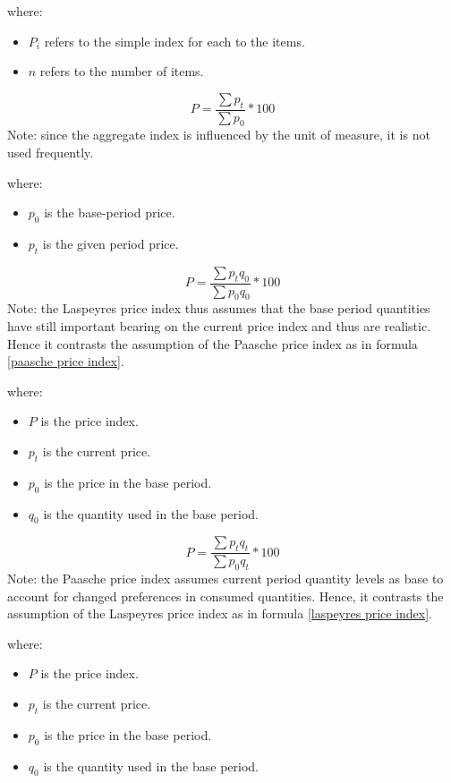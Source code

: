 where:
\begin{itemize}
 \item $P_i$ refers to the simple index for each to the items.
 \item $n$ refers to the number of items. 
\end{itemize}
\hformbar


\begin{equation}
\label{simple aggregate index}
P = \frac{\sum p_t}{\sum p_0}*100
\end{equation}
Note: since the aggregate index is influenced by the unit of measure, it is not used frequently.

where:
\begin{itemize}
 \item $p_0$ is the base-period price.
 \item $p_t$ is the given period price. 
\end{itemize}
\hformbar


\begin{equation}
\label{laspeyres price index}
P = \frac{\sum p_t q_0}{\sum p_0 q_0}*100
\end{equation}
Note: the Laspeyres price index thus assumes that the base period quantities have still important bearing on the current price index and thus are realistic. Hence it contrasts the assumption of the Paasche price index as in formula \eqref{paasche price index}.

where:
\begin{itemize}
 \item $P$ is the price index.
 \item $p_t$ is the current price.
 \item $p_0$ is the price in the base period.
 \item $q_0$ is the quantity used in the base period.
\end{itemize}
\hformbar


\begin{equation}
\label{paasche price index}
P = \frac{\sum p_t q_t}{\sum p_0 q_t}*100
\end{equation}
Note: the Paasche price index assumes current period quantity levels as base to account for changed preferences in consumed quantities. Hence, it contrasts the assumption of the Laspeyres price index as in formula \eqref{laspeyres price index}.

where:
\begin{itemize}
 \item $P$ is the price index.
 \item $p_t$ is the current price.
 \item $p_0$ is the price in the base period.
 \item $q_0$ is the quantity used in the base period.
\end{itemize}
\hformbar


